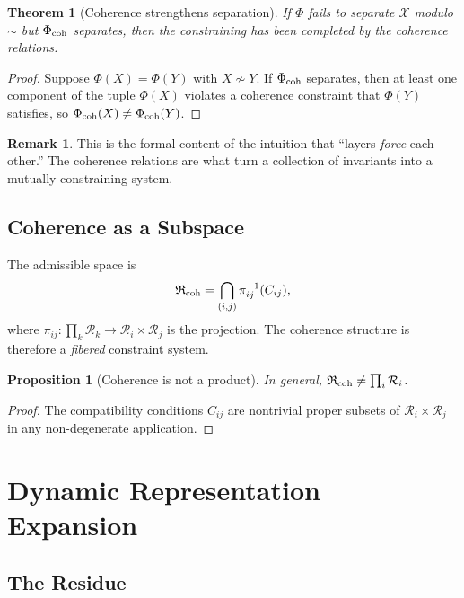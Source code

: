 \documentclass[11pt,a4paper]{article}
\theoremstyle{definition}
\newtheorem{remark}[definition]{Remark}
\theoremstyle{plain}
\newtheorem{proposition}[definition]{Proposition}
\newtheorem{theorem}[definition]{Theorem}
\newcommand{\Rcal}{\mathcal{R}}
\newcommand{\Xcal}{\mathcal{X}}
\newcommand{\Rfrak}{\mathfrak{R}}
\newcommand{\Phimap}{\Phi}
\newcommand{\simadm}{\sim}
\begin{document}
\begin{theorem}[Coherence strengthens separation]\label{thm:coherence-strengthens}
If $\Phimap$ fails to separate $\Xcal$ modulo $\simadm$ but
$\Phimap_{\rm coh}$ separates, then the constraining has been
completed by the coherence relations.
\end{theorem}

\begin{proof}
Suppose $\Phimap(X) = \Phimap(Y)$ with $X \not\simadm Y$. If
$\Phimap_{\rm coh}$ separates, then at least one component of the
tuple $\Phimap(X)$ violates a coherence constraint that
$\Phimap(Y)$ satisfies, so $\Phimap_{\rm coh}(X) \neq
\Phimap_{\rm coh}(Y)$.
\end{proof}

\begin{remark}
This is the formal content of the intuition that ``layers
\emph{force} each other.'' The coherence relations are what turn a
collection of invariants into a mutually constraining system.
\end{remark}

\subsection{Coherence as a Subspace}

The admissible space is
\[
  \Rfrak_{\rm coh}
  =
  \bigcap_{(i,j)} \pi_{ij}^{-1}(C_{ij}),
\]
where $\pi_{ij} : \prod_k \Rcal_k \to \Rcal_i \times \Rcal_j$ is
the projection. The coherence structure is therefore a
\emph{fibered} constraint system.

\begin{proposition}[Coherence is not a product]\label{prop:not-product}
In general, $\Rfrak_{\rm coh} \neq \prod_{i} \Rcal_i$.
\end{proposition}

\begin{proof}
The compatibility conditions $C_{ij}$ are nontrivial proper subsets
of $\Rcal_i \times \Rcal_j$ in any non-degenerate application.
\end{proof}

\section{Dynamic Representation Expansion}
\label{sec:expansion}

\subsection{The Residue}
\end{document}
